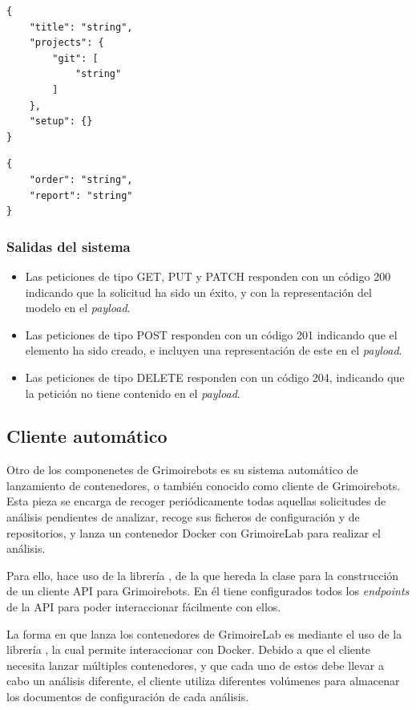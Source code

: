 \begin{lstlisting}
{
    "title": "string",
    "projects": {
        "git": [
            "string"
        ]
    },
    "setup": {}
}
\end{lstlisting}

\begin{lstlisting}
{
    "order": "string",
    "report": "string"
}
\end{lstlisting}

\subsubsection{Salidas del sistema}

\begin{itemize}
    \item Las peticiones de tipo GET, PUT y PATCH responden con un código 200 indicando que la solicitud ha sido un éxito, y con la representación del modelo en el \emph{payload}.
    \item Las peticiones de tipo POST responden con un código 201 indicando que el elemento ha sido creado, e incluyen una representación de este en el \emph{payload}.
    \item Las peticiones de tipo DELETE responden con un código 204, indicando que la petición no tiene contenido en el \emph{payload}.
\end{itemize}

\subsection{Cliente automático}

Otro de los componenetes de Grimoirebots es su sistema automático de lanzamiento de contenedores, o también conocido como cliente de Grimoirebots. Esta pieza se encarga de recoger periódicamente todas aquellas solicitudes de análisis pendientes de analizar, recoge sus ficheros de configuración y de repositorios, y lanza un contenedor Docker con GrimoireLab para realizar el análisis.

Para ello, hace uso de la librería , de la que hereda la clase  para la construcción de un cliente API para Grimoirebots. En él tiene configurados todos los \emph{endpoints} de la API para poder interaccionar fácilmente con ellos.

La forma en que lanza los contenedores de GrimoireLab es mediante el uso de la librería , la cual permite interaccionar con Docker. Debido a que el cliente necesita lanzar múltiples contenedores, y que cada uno de estos debe llevar a cabo un análisis diferente, el cliente utiliza diferentes volúmenes para almacenar los documentos de configuración de cada análisis.


